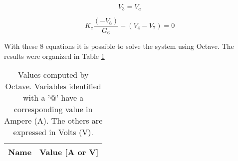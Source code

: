 \begin{equation}
	V_3 = V_a
	\label{}
\end{equation}

\begin{equation}
	K_c\frac{(-V_6)}{G_6}-(V_4-V_7)=0
	\label{}
\end{equation}


With these 8 equations it is possible to solve the system using Octave.
The results were organized in Table \ref{tab:node}

\begin{table}[h]
	\centering
	\begin{tabular}{|l|r|}
    		\hline    
    		{\bf Name} & {\bf Value [A or V]} \\ \hline
    		
  	\end{tabular}
  	\caption{Values computed by Octave. Variables identified with a '$@$' have a
  	corresponding value in Ampere (A). The others are expressed in Volts (V).}
 
\label{tab:node}
\end{table}


